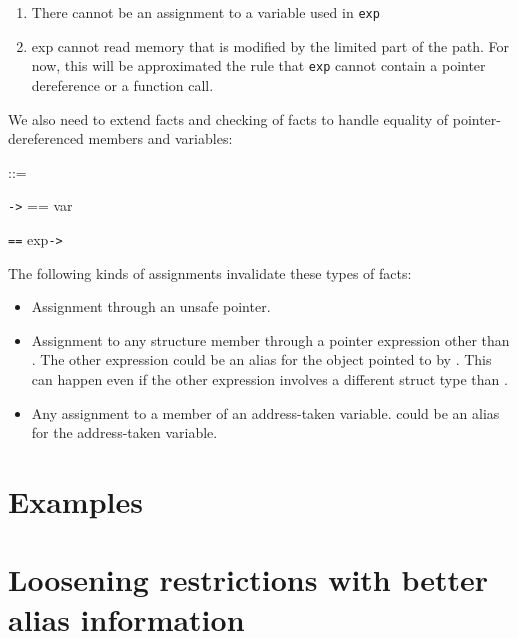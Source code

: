 \begin{enumerate}
\begin{enumerate}
    \begin{enumerate}
    \item
      There cannot be an assignment to a variable used in \texttt{exp}
    \item
      exp cannot read memory that is modified by the limited part of the
      path. For now, this will be approximated the rule that
      \texttt{exp} cannot contain a pointer dereference or a function
      call.
    \end{enumerate}
  \end{enumerate}
\end{enumerate}

We also need to extend facts and checking of facts to handle equality of
pointer-dereferenced members and variables:

 ::=

\texttt{-\textgreater{}} == var

 \texttt{==} exp\texttt{-\textgreater{}}

The following kinds of assignments invalidate these types of facts:

\begin{itemize}
\item
  Assignment through an unsafe pointer.
\item
  Assignment to any structure member through a pointer expression other
  than . The other expression could be an alias for the object
  pointed to by . This can happen even if the other expression
  involves a different struct type than .
\item
  Any assignment to a member of an address-taken variable. 
  could be an alias for the address-taken variable.
\end{itemize}

\section{Examples}
\section{Loosening restrictions with better alias information}
\label{section:better-alias-information}
